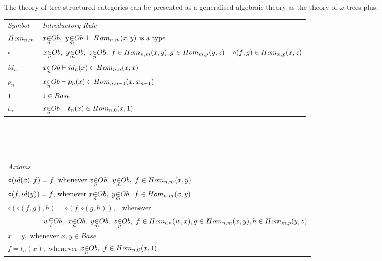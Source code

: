 \documentclass[10pt,a4paper]{scrartcl}
\begin{document}
\noindent The theory of tree-structured categories can be presented as a generalised algebraic theory as 
the theory of  $\omega$-trees plus: \\
\vspace{0.03cm} 
\begin{tabular}{>{\itshape}l l}
Symbol & \itshape{Introductory Rule} \\[0.1cm]
$Hom_{n,m} $ &$\ofObi{x}{n} ,\  \ofObi{y}{m} \ \tstyle \isT{\HomijBar{n}{m}{x}{y}} $\\ [0.25cm]
$\circ$ & $\ofObi{x}{n}, \  \ofObi{y}{m}, \ \ofObi{z}{p}, \ \ofHomij{f}{n}{m}{x}{y},\ofHomij{g}{m}{p}{y}{z} \tstyle \ofHomij{\circ(f,g)}{n}{p}{x}{z}$ \\ [0.25cm]
$id_n   $   & $ \ofObi{x}{n} \tstyle \ofHomij{id_n(x)}{n}{n}{x}{x} $\\ [0.25cm]
$p_n   $   & $ \ofObi{x}{n} \tstyle \ofHomij{p_n(x)}{n}{n-1}{x}{x_{n-1}} $\\ [0.25cm]
$1     $   & $1 \in Base $\\         [0.25cm]
$t_n   $   & $ \ofObi{x}{n} \tstyle t_n(x) \in \Homij{n}{0}(x,1)$\\ [0.25cm]
\end{tabular} \\
\vspace{.1cm}  \\
\vspace{.03cm} \\
\begin{tabular}{l}
\itshape{Axioms} \\

$\circ(id(x),f)=f \mbox{,  whenever\ } \ofObi{x}{n} ,\  \ofObi{y}{m} , \ \ofHomij{f}{n}{m}{x}{y}  $\\ [0.25cm]
$\circ(f,id(y))=f \mbox{,  whenever\ } \ofObi{x}{n} ,\  \ofObi{y}{m} , \ \ofHomij{f}{n}{m}{x}{y}  $\\ [0.25cm]
$ \circ(\circ(f,g),h) = \circ(f,\circ(g,h)),$ \ whenever \\ [0.2cm]
$ \ \ \ \ \ \ \ \ \ \ \ \ \ \ \ 
\ofObi{w}{l} , \ \ofObi{x}{n} , \ \ofObi{y}{m} , \ \ofObi{z}{p}, \ 
 \ofHomij{f}{l}{n}{w}{x}, \ofHomij{g}{n}{m}{x}{y}, \ofHomij{h}{m}{p}{y}{z}$ \\ [0.25cm]
$x = y, $ whenever $x,y \in Base $ \\ [0.25cm]
$f = t_n(x),  $ whenever $ \ofObi{x}{n}, \ f \in \Homij{n}{0}(x,1)$\\ [0.25cm]
\end{tabular}  \\
\vspace{.05cm}  \\
\end{document}
